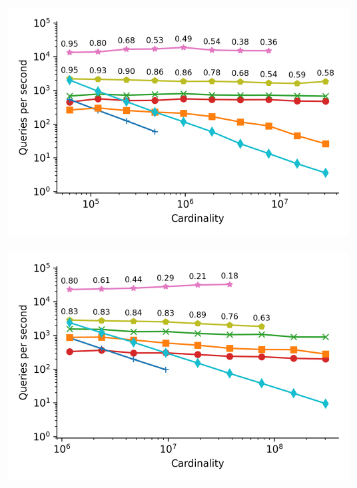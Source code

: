 \begin{figure}
    \begin{subfigure}[b]{0.5\textwidth}
        \includegraphics[width=0.99\textwidth]{plots/fashion-mnist_PermutedBall_10_throughput.png}
        \label{fig:results:fashion-mnist-scaling}
    \end{subfigure}%
    \begin{subfigure}[b]{0.5\textwidth}
        \includegraphics[width=0.99\textwidth]{plots/glove-25_PermutedBall_10_throughput.png}
        \label{fig:results:glove-25-scaling}
    \end{subfigure}%
    \\
    \begin{subfigure}[b]{0.5\textwidth}

\end{subfigure}
\end{figure}
